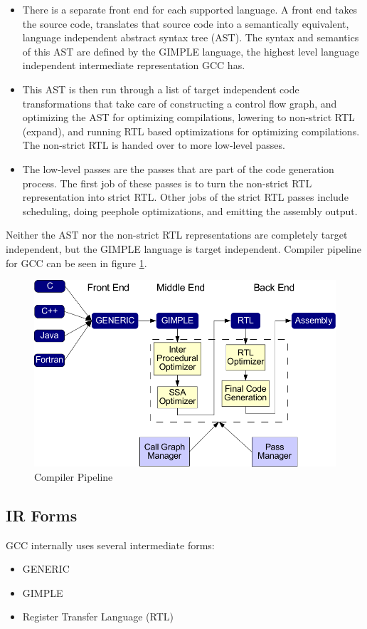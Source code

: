 \begin{itemize}
	\item There is a separate front end for each supported language. A front end takes the source code, translates that source code into a semantically equivalent, language independent abstract syntax tree (AST). The syntax and semantics of this AST are defined by the GIMPLE language, the highest level language independent intermediate representation GCC has.
	\item This AST is then run through a list of target independent code transformations that take care of constructing a control flow graph, and optimizing the AST for optimizing compilations, lowering to non-strict RTL (expand), and running RTL based optimizations for optimizing compilations. The non-strict RTL is handed over to more low-level passes.
	\item The low-level passes are the passes that are part of the code generation process. The first job of these passes is to turn the non-strict RTL representation into strict RTL. Other jobs of the strict RTL passes include scheduling, doing peephole optimizations, and emitting the assembly output.
\end{itemize}
	Neither the AST nor the non-strict RTL representations are completely target independent, but the GIMPLE language is target independent.
	Compiler pipeline for GCC can be seen in figure \ref{fig:pipeline}.

\begin{figure}[htb]
\centering
\includegraphics[scale=0.3]{./gcc-pipeline}
\caption{Compiler Pipeline\cite{dnovillo}}
\label{fig:pipeline}
\end{figure}


\subsection{IR Forms}
GCC internally uses several intermediate forms:
\begin{itemize}
	\item GENERIC
	\item GIMPLE
	\item Register Transfer Language (RTL)
\end{itemize}

